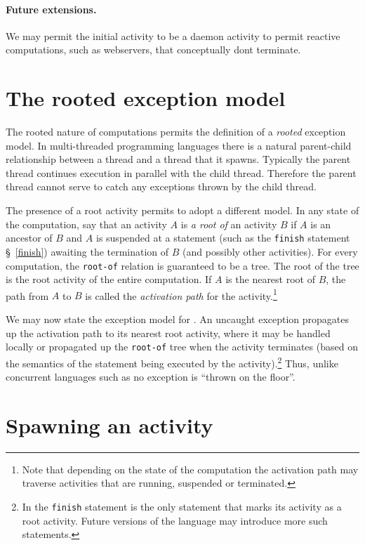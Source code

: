 \paragraph{Future extensions.} 
We may permit the initial activity to be a daemon activity to permit
reactive computations, such as webservers, that conceptually dont
terminate.

\section{The \Xten{} rooted exception model}
\label{ExceptionModel}

The rooted nature of \Xten{} computations permits the definition of a
{\em rooted} exception model. In multi-threaded programming languages
there is a natural parent-child relationship between a thread and a
thread that it spawns. Typically the parent thread continues execution
in parallel with the child thread. Therefore the parent thread cannot
serve to catch any exceptions thrown by the child thread. 

The presence of a root activity permits \Xten{} to adopt a different
model.  In any state of the computation, say that an activity $A$ is
{\em a root of} an activity $B$ if $A$ is an ancestor of $B$ and $A$
is suspended at a statement (such as the {\tt finish} statement
\S~\ref{finish}) awaiting the termination of $B$ (and possibly other
activities). For every \Xten{} computation, the {\tt root-of} relation
is guaranteed to be a tree. The root of the tree is the root activity
of the entire computation. If $A$ is the nearest root of $B$, the path
from $A$ to $B$ is called the {\em activation path} for the
activity.\footnote{Note that depending on the state of the computation
the activation path may traverse activities that are running,
suspended or terminated.}

We may now state the exception model for \Xten.  An uncaught exception
propagates up the activation path to its nearest root activity, where
it may be handled locally or propagated up the {\tt root-of} tree when
the activity terminates (based on the semantics of the statement being
executed by the activity).\footnote{In \XtenCurrVer{} the {\tt finish}
statement is the only statement that marks its activity as a root
activity. Future versions of the language may introduce more such
statements.}  Thus, unlike concurrent languages such as \java{} no
exception is ``thrown on the floor''.

\section{Spawning an activity}\label{AsynchronousActivity}\label{AsyncActivity}

